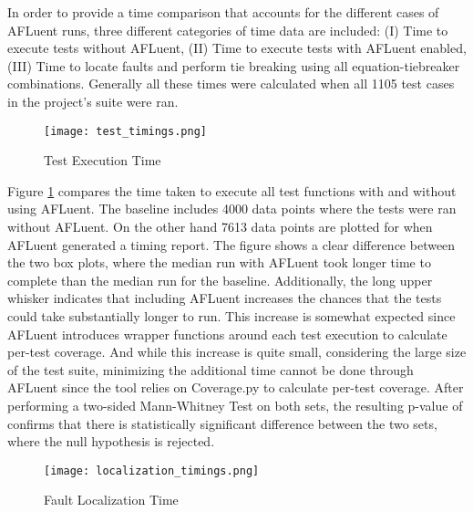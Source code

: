 In order to provide a time comparison that accounts for the different cases of
AFLuent runs, three different categories of time data are included: (I) Time to
execute tests without AFLuent, (II) Time to execute tests with AFLuent enabled,
(III) Time to locate faults and perform tie breaking using all
equation-tiebreaker combinations. Generally all these times were calculated when
all 1105 test cases in the project's suite were ran.

\begin{figure}[!htb]
	\begin{center}
		\texttt{[image: test\_timings.png]}
		\caption{\label{fig:test_timings} Test Execution Time}
	\end{center}
\end{figure}

Figure \ref{fig:test_timings} compares the time taken to execute all test
functions with and without using AFLuent. The baseline includes
4000 data points where the tests were ran without AFLuent. On the other hand
7613 data points are plotted for when AFLuent generated a timing report. The
figure shows a clear difference between the two box plots, where the median run with
AFLuent took longer time to complete than the median run for the baseline.
Additionally, the long upper whisker indicates that
including AFLuent increases the chances that the tests could take substantially
longer to run. This increase is somewhat expected since AFLuent introduces
wrapper functions around each test execution to calculate per-test coverage. And
while this increase is quite small, considering the large size of the test suite,
minimizing the additional time cannot be done through AFLuent since the tool
relies on Coverage.py to calculate per-test coverage. After performing a two-sided
Mann-Whitney Test on both sets, the resulting p-value of
 confirms that there is statistically significant difference
between the two sets, where the null hypothesis is rejected.

\begin{figure}[!htb]
	\begin{center}
		\texttt{[image: localization\_timings.png]}
		\caption{\label{fig:localization_timings} Fault Localization Time}
	\end{center}
\end{figure}

